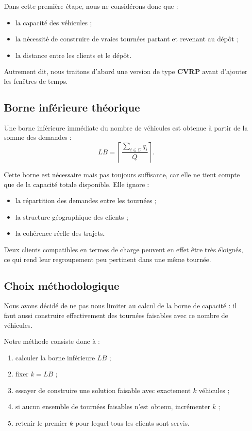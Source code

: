 \documentclass[11pt,a4paper]{article}
\begin{document}
Dans cette première étape, nous ne considérons donc que :
\begin{itemize}
    \item la capacité des véhicules ;
    \item la nécessité de construire de vraies tournées partant et revenant au dépôt ;
    \item la distance entre les clients et le dépôt.
\end{itemize}

Autrement dit, nous traitons d'abord une version de type \textbf{CVRP} avant d'ajouter les fenêtres de temps.

\subsection{Borne inférieure théorique}
Une borne inférieure immédiate du nombre de véhicules est obtenue à partir de la somme des demandes :
\[
LB = \left\lceil \frac{\sum_{i \in C} q_i}{Q} \right\rceil.
\]

Cette borne est nécessaire mais pas toujours suffisante, car elle ne tient compte que de la capacité totale disponible. Elle ignore :
\begin{itemize}
    \item la répartition des demandes entre les tournées ;
    \item la structure géographique des clients ;
    \item la cohérence réelle des trajets.
\end{itemize}

Deux clients compatibles en termes de charge peuvent en effet être très éloignés, ce qui rend leur regroupement peu pertinent dans une même tournée.

\subsection{Choix méthodologique}
Nous avons décidé de ne pas nous limiter au calcul de la borne de capacité : il faut aussi construire effectivement des tournées faisables avec ce nombre de véhicules.

Notre méthode consiste donc à :
\begin{enumerate}[label=\arabic*.]
    \item calculer la borne inférieure \(LB\) ;
    \item fixer \(k = LB\) ;
    \item essayer de construire une solution faisable avec exactement \(k\) véhicules ;
    \item si aucun ensemble de tournées faisables n'est obtenu, incrémenter \(k\) ;
    \item retenir le premier \(k\) pour lequel tous les clients sont servis.
\end{enumerate}
\end{document}
